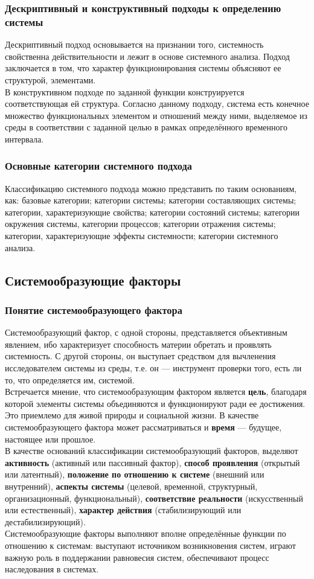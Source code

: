 \documentclass{article}
\newcommand{\important}[1]{\textbf{#1}}
\begin{document}
\subsubsection*{Дескриптивный и конструктивный подходы к определению системы}
Дескриптивный подход основывается на признании того, системность свойственна действительности и лежит в основе системного анализа. Подход заключается в том, что характер функционирования системы объясняют ее структурой, элементами.
\\
В конструктивном подходе по заданной функции конструируется соответствующая ей структура. Согласно данному подходу, система есть конечное множество функциональных элементом и отношений между ними, выделяемое из среды в соответствии с заданной целью в рамках определённого временного интервала.
\subsubsection*{Основные категории системного подхода}
Классификацию системного подхода можно представить по таким основаниям, как: базовые категории; категории системы; категории составляющих системы; категории, характеризующие свойства; категории состояний системы; категории окружения системы, категории процессов; категории отражения системы; категории, характеризующие эффекты системности; категории системного анализа.
\subsection{Системообразующие факторы}
\subsubsection*{Понятие системообразующего фактора}
Системообразующий фактор, с одной стороны, представляется объективным явлением, ибо характеризует способность материи обретать и проявлять системность. С другой стороны, он выступает средством для вычленения исследователем системы из среды, т.е. он --- инструмент проверки того, есть ли то, что определяется им, системой.
\\
Встречается мнение, что системообразующим фактором является \important{цель}, благодаря которой элементы системы объединяются и функционируют ради ее достижения. Это приемлемо для живой природы и социальной жизни. В качестве системообразующего фактора может рассматриваться и \important{время} --- будущее, настоящее или прошлое.
\\
В качестве оснований классификации системообразующий факторов, выделяют \important{активность} (активный или пассивный фактор), \important{способ проявления} (открытый или латентный), \important{положение по отношению к системе} (внешний или внутренний), \important{аспекты системы} (целевой, временной, структурный, организационный, функциональный), \important{соответствие реальности} (искусственный или естественный), \important{характер действия} (стабилизирующий или дестабилизирующий).
\\
Системообразующие факторы выполняют вполне определённые функции по отношению к системам: выступают источником возникновения систем, играют важную роль в поддержании равновесия систем, обеспечивают процесс наследования в системах.
\end{document}
